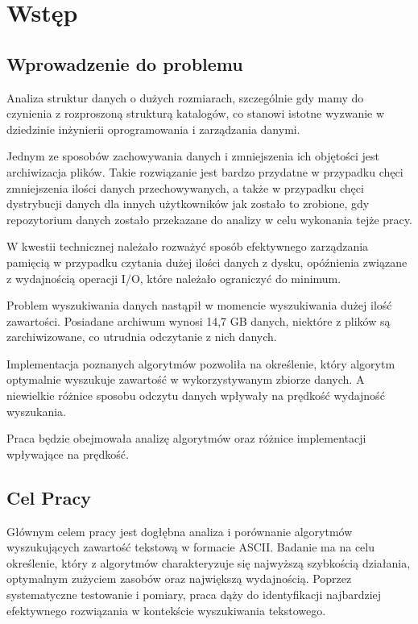 \chapter{Wstęp}

\section{Wprowadzenie do problemu}
Analiza struktur danych o dużych rozmiarach, szczególnie gdy mamy do czynienia
z rozproszoną strukturą katalogów, co stanowi istotne wyzwanie w dziedzinie 
inżynierii oprogramowania i zarządzania danymi. 

Jednym ze sposobów zachowywania danych i zmniejszenia ich objętości jest 
archiwizacja plików. Takie rozwiązanie jest bardzo przydatne w przypadku chęci
zmniejszenia ilości danych przechowywanych, a także w przypadku chęci 
dystrybucji danych dla innych użytkowników jak zostało to zrobione, gdy 
repozytorium danych zostało przekazane do analizy w celu wykonania tejże pracy.

W kwestii technicznej należało rozważyć sposób efektywnego zarządzania pamięcią
w przypadku czytania dużej ilości danych z dysku, opóźnienia związane z 
wydajnością operacji I/O, które należało ograniczyć do minimum.

Problem wyszukiwania danych nastąpił w momencie wyszukiwania dużej ilość 
zawartości. Posiadane archiwum wynosi 14,7 GB danych, niektóre z plików są 
zarchiwizowane, co utrudnia odczytanie z nich danych. 

Implementacja poznanych algorytmów pozwoliła na określenie, który algorytm 
optymalnie wyszukuje zawartość w wykorzystywanym zbiorze danych. A niewielkie
różnice sposobu odczytu danych wpływały na prędkość wydajność wyszukania.

Praca będzie obejmowała analizę algorytmów oraz różnice implementacji wpływające
na prędkość. 

\section{Cel Pracy}
Głównym celem pracy jest dogłębna analiza i porównanie algorytmów wyszukujących zawartość tekstową w formacie ASCII.
Badanie ma na celu określenie, który z algorytmów charakteryzuje się najwyższą szybkością działania,
optymalnym zużyciem zasobów oraz największą wydajnością. Poprzez systematyczne testowanie i pomiary,
praca dąży do identyfikacji najbardziej efektywnego rozwiązania w kontekście wyszukiwania tekstowego.

